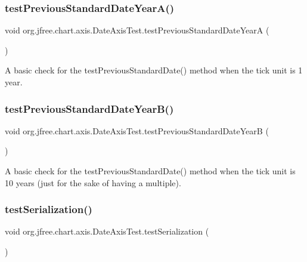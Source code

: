 \subsubsection{\texorpdfstring{test\+Previous\+Standard\+Date\+Year\+A()}{testPreviousStandardDateYearA()}}
{\footnotesize\ttfamily void org.\+jfree.\+chart.\+axis.\+Date\+Axis\+Test.\+test\+Previous\+Standard\+Date\+YearA (\begin{DoxyParamCaption}{ }\end{DoxyParamCaption})}

A basic check for the test\+Previous\+Standard\+Date() method when the tick unit is 1 year. \mbox{\label{classorg_1_1jfree_1_1chart_1_1axis_1_1_date_axis_test_a4a7b7602cc586b3b0f1850a8c750c220}} 
\subsubsection{\texorpdfstring{test\+Previous\+Standard\+Date\+Year\+B()}{testPreviousStandardDateYearB()}}
{\footnotesize\ttfamily void org.\+jfree.\+chart.\+axis.\+Date\+Axis\+Test.\+test\+Previous\+Standard\+Date\+YearB (\begin{DoxyParamCaption}{ }\end{DoxyParamCaption})}

A basic check for the test\+Previous\+Standard\+Date() method when the tick unit is 10 years (just for the sake of having a multiple). \mbox{\label{classorg_1_1jfree_1_1chart_1_1axis_1_1_date_axis_test_a7bb490e6fc9238ae69c5113067a95dc8}} 
\subsubsection{\texorpdfstring{test\+Serialization()}{testSerialization()}}
{\footnotesize\ttfamily void org.\+jfree.\+chart.\+axis.\+Date\+Axis\+Test.\+test\+Serialization (\begin{DoxyParamCaption}{ }\end{DoxyParamCaption})}

